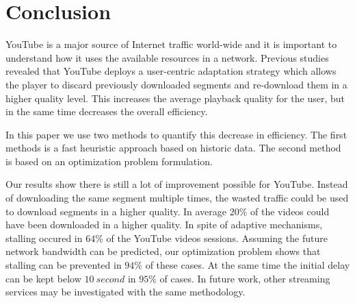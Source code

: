 
\section{Conclusion}
\label{sec:conclusion}

YouTube is a major source of Internet traffic world-wide and it is important to understand how it uses the available resources in a network.
Previous studies revealed that YouTube deploys a user-centric adaptation strategy which allows the player to discard previously downloaded segments and re-download them in a higher quality level.
This increases the average playback quality for the user, but in the same time decreases the overall efficiency.

In this paper we use two methods to quantify this decrease in efficiency.
The first methods is a fast heuristic approach based on historic data.
The second method is based on an optimization problem formulation.

Our results show there is still a lot of improvement possible for YouTube. Instead of downloading the same segment multiple times, the wasted traffic could be used to download segments in a higher quality. In average $20\%$ of the videos could have been downloaded in a higher quality. In spite of adaptive mechanisms, stalling occured in $64\%$ of the YouTube videos sessions. Assuming the future network bandwidth can be predicted, our optimization problem shows that stalling can be prevented in $94\%$ of these cases. At the same time the initial delay can be kept below $\SI{10}{second}$ in $95\%$ of cases. In future work, other streaming services may be investigated with the same methodology.
